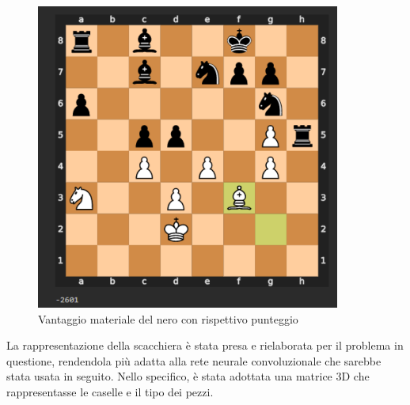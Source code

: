 \begin{figure}[!htb]
    \includegraphics[width=10cm]{frontmatter/figure/valutazione_scacchiera.pdf}
    \centering
    \caption{Vantaggio materiale del nero con rispettivo punteggio}
    \label{fig:valutazione_scacchiera}
\end{figure}

La rappresentazione della scacchiera è stata presa e rielaborata per il problema in questione, rendendola più adatta alla rete neurale convoluzionale che sarebbe stata usata in seguito. Nello specifico, è stata adottata una matrice 3D che rappresentasse le caselle e il tipo dei pezzi.

\newpage
